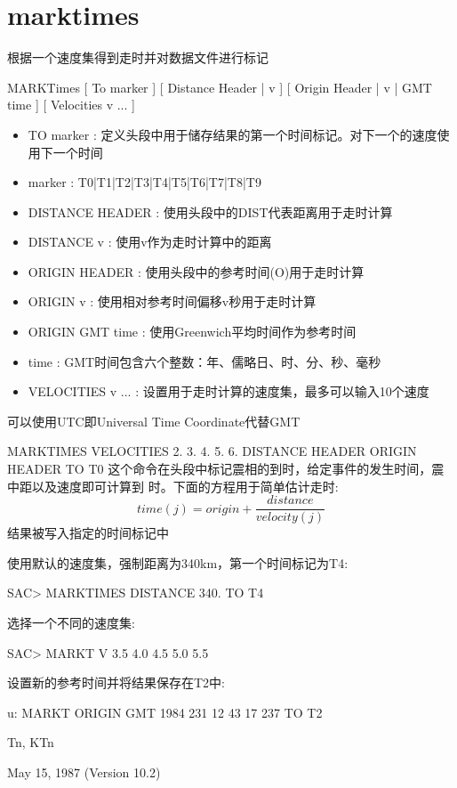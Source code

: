 \section{marktimes}
\label{cmd:marktimes}

根据一个速度集得到走时并对数据文件进行标记

MARKTimes [ To marker ] [ Distance Header | v ] [ Origin Header | v | GMT time ] [ Velocities v ... ]

\begin{itemize}
\item TO marker : 定义头段中用于储存结果的第一个时间标记。对下一个的速度使用下一个时间 
\item marker :  T0|T1|T2|T3|T4|T5|T6|T7|T8|T9 
\item DISTANCE HEADER : 使用头段中的DIST代表距离用于走时计算 
\item DISTANCE v : 使用v作为走时计算中的距离 
\item ORIGIN HEADER : 使用头段中的参考时间(O)用于走时计算 
\item ORIGIN v : 使用相对参考时间偏移v秒用于走时计算 
\item ORIGIN GMT time : 使用Greenwich平均时间作为参考时间 
\item time :  GMT时间包含六个整数：年、儒略日、时、分、秒、毫秒 
\item VELOCITIES v ... : 设置用于走时计算的速度集，最多可以输入10个速度 
\end{itemize}

可以使用UTC即Universal Time Coordinate代替GMT

MARKTIMES VELOCITIES 2. 3. 4. 5. 6.  DISTANCE HEADER ORIGIN HEADER TO T0
这个命令在头段中标记震相的到时，给定事件的发生时间，震中距以及速度即可计算到	时。下面的方程用于简单估计走时:
 		\[ time(j) = origin + \frac{distance}{velocity(j)} \]
结果被写入指定的时间标记中

使用默认的速度集，强制距离为340km，第一个时间标记为T4:
\begin{SACCode}
SAC> MARKTIMES DISTANCE 340. TO T4
\end{SACCode}

选择一个不同的速度集:
\begin{SACCode}
SAC> MARKT V 3.5 4.0 4.5 5.0 5.5
\end{SACCode}

设置新的参考时间并将结果保存在T2中:
\begin{SACCode}
u: MARKT ORIGIN GMT 1984 231 12 43 17 237 TO T2
\end{SACCode}

Tn, KTn

May 15, 1987 (Version 10.2)

